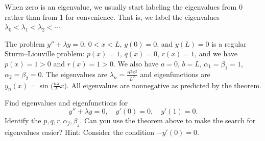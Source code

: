 When zero
is an eigenvalue, we usually
start labeling the eigenvalues from 0 rather than from 1 for convenience.
That is, we label the eigenvalues $\lambda_0 < \lambda_1 < \lambda_2 < \cdots$.

\begin{example}
The problem $y''+\lambda y=0$, $0 < x < L$, $y(0) = 0$, and $y(L) = 0$
is a regular Sturm--Liouville problem:  $p(x) = 1$, $q(x) = 0$, $r(x) = 1$,
and we have $p(x) = 1 > 0$ and $r(x) = 1 > 0$.  We also have
$a=0$, $b=L$, $\alpha_1 = \beta_1 = 1$, $\alpha_2 = \beta_2 = 0$.
The eigenvalues are $\lambda_n = \frac{n^2 \pi^2}{L^2}$ and eigenfunctions
are $y_n(x) = \sin\bigl(\frac{n\pi}{L} x\bigr)$.  All eigenvalues are nonnegative as
predicted by the theorem.
\end{example}

\begin{exercise}
Find eigenvalues and eigenfunctions for
\begin{equation*}
y'' + \lambda y = 0, \quad y'(0) = 0, \quad y'(1) = 0.
\end{equation*}
Identify
the $p, q, r, \alpha_j, \beta_j$.
Can you use the theorem above to make the search for eigenvalues easier?
Hint: Consider the condition $-y'(0)=0$.
\end{exercise}

